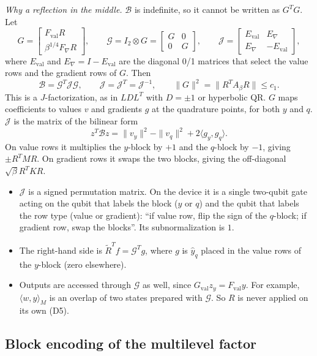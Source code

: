 \documentclass[11pt,a4paper]{article}
\newcommand{\B}{\mathcal{B}}
\newcommand{\G}{\mathcal{G}}
\newcommand{\J}{\mathcal{J}}
\newcommand{\Rt}{\widetilde R}
\theoremstyle{remark}
\begin{document}
\emph{Why a reflection in the middle.} $\B$ is indefinite, so it cannot be
written as $G^TG$. Let
\[
G=\begin{bmatrix}F_{\mathrm{val}}R\\ \beta^{1/4}F_\nabla R\end{bmatrix},\qquad
\G=I_2\otimes G=\begin{bmatrix}G&0\\0&G\end{bmatrix},\qquad
\J=\begin{bmatrix}E_{\mathrm{val}} & E_\nabla\\ E_\nabla & -E_{\mathrm{val}}\end{bmatrix},
\]
where $E_{\mathrm{val}}$ and $E_\nabla=I-E_{\mathrm{val}}$ are the diagonal 0/1 matrices that
select the value rows and the gradient rows of $G$. Then
\begin{equation}\label{eq:BGJG}
\B=\G^T\J\G,\qquad \J=\J^T=\J^{-1},\qquad \|G\|^2=\|R^TA_\beta R\|\le c_1 .
\end{equation}
This is a $J$-factorization, as in $LDL^T$ with $D=\pm1$ or hyperbolic QR.
$G$ maps coefficients to values $v$ and gradients $g$ at the quadrature
points, for both $y$ and $q$. $\J$ is the matrix of the bilinear form
\[
z^T\B z=\|v_y\|^2-\|v_q\|^2+2\langle g_y,g_q\rangle .
\]
On value rows it multiplies the $y$-block by $+1$ and the $q$-block by
$-1$, giving $\pm R^TMR$. On gradient rows it swaps the two blocks, giving
the off-diagonal $\sqrt\beta R^TKR$.
\begin{itemize}
\item $\J$ is a signed permutation matrix. On the device it is a single
  two-qubit gate acting on the qubit that labels the block ($y$ or $q$)
  and the qubit that labels the row type (value or gradient): ``if value
  row, flip the sign of the $q$-block; if gradient row, swap the
  blocks''. Its subnormalization is $1$.
\item The right-hand side is $\Rt^Tf=\G^Tg$, where $g$ is $\hat y_q$ placed in
  the value rows of the $y$-block (zero elsewhere).
\item Outputs are accessed through $\G$ as well, since $G_{\mathrm{val}}z_y=F_{\mathrm{val}}y$.
  For example, $\langle w,y\rangle_M$ is an overlap of two states prepared
  with $\G$. So $R$ is never applied on its own (D5).
\end{itemize}

\subsection{Block encoding of the multilevel factor}
\end{document}
